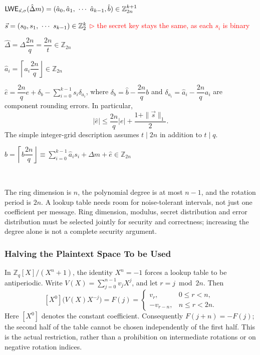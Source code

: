 $ $

$\textsf{LWE}_{\vec{s}, \sigma}(\hat{\Delta} m) = (\hat{a}_0, \hat{a}_1, \text{ } \text{$\cdots$} \text{ } \hat{a}_{k-1}, \hat{b}) \in \mathbb{Z}_{2n}^{k+1}$

$\vec{s} = (s_0, s_1, \text{ } \text{$\cdots$} \text{ } s_{k-1}) \in \mathbb{Z}_2^{k}$  \textcolor{red}{ $\rhd$ the secret key stays the same, as each $s_i$ is binary}

$\hat{\Delta} = \Delta\dfrac{2n}{q} = \dfrac{2n}{t} \in \mathbb{Z}_{2n}$

$\hat{a}_i = \left \lceil a_i\dfrac{2n}{q} \right \rfloor \in \mathbb{Z}_{2n}$

$\hat e=\dfrac{2n}{q}e+\delta_b-\sum_{i=0}^{k-1}s_i\delta_{a_i}$, where $\delta_b=\hat b-\dfrac{2n}{q}b$ and $\delta_{a_i}=\hat a_i-\dfrac{2n}{q}a_i$ are component rounding errors. In particular,
\[
|\hat e|\leq\dfrac{2n}{q}|e|+\dfrac{1+\|\vec s\|_1}{2}.
\]
The simple integer-grid description assumes $t\mid 2n$ in addition to $t\mid q$.

$\hat{b} = \left \lceil b\dfrac{2n}{q} \right \rfloor \equiv \sum\limits_{i=0}^{k-1} \hat{a}_is_i + \hat{\Delta} m + \hat{e}  \in \mathbb{Z}_{2n}$



$ $

 The ring dimension is $n$, the polynomial degree is at most $n-1$, and the rotation period is $2n$. A lookup table needs room for noise-tolerant intervals, not just one coefficient per message. Ring dimension, modulus, secret distribution and error distribution must be selected jointly for security and correctness; increasing the degree alone is not a complete security argument.



\subsubsection{Halving the Plaintext Space To be Used}
\label{subsec:tfhe-zero-padding} 

In $\mathbb Z_q[X]/(X^n+1)$, the identity $X^n=-1$ forces a lookup table to be antiperiodic. Write $V(X)=\sum_{j=0}^{n-1}v_jX^j$, and let $r=j\bmod 2n$. Then
\[
[X^0]\bigl(V(X)X^{-j}\bigr)=F(j)=
\begin{cases}
v_r,&0\leq r<n,\\
-v_{r-n},&n\leq r<2n.
\end{cases}
\]
Here $[X^0]$ denotes the constant coefficient. Consequently $F(j+n)=-F(j)$; the second half of the table cannot be chosen independently of the first half. This is the actual restriction, rather than a prohibition on intermediate rotations or on negative rotation indices.


